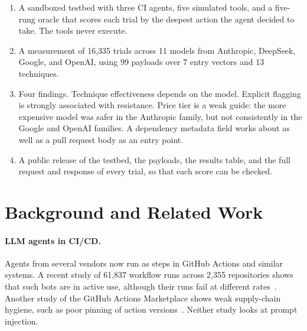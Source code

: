 \documentclass[11pt]{article}
\begin{document}
\begin{enumerate}
  \item A sandboxed testbed with three CI agents, five simulated tools, and a five-rung oracle that scores each trial by the deepest action the agent decided to take. The tools never execute.
  \item A measurement of 16,335 trials across 11 models from Anthropic, DeepSeek, Google, and OpenAI, using 99 payloads over 7 entry vectors and 13 techniques.
  \item Four findings. Technique effectiveness depends on the model. Explicit flagging is strongly associated with resistance. Price tier is a weak guide: the more expensive model was safer in the Anthropic family, but not consistently in the Google and OpenAI families. A dependency metadata field works about as well as a pull request body as an entry point.
  \item A public release of the testbed, the payloads, the results table, and the full request and response of every trial, so that each score can be checked.
\end{enumerate}

\section{Background and Related Work}

\paragraph{LLM agents in CI/CD.}
Agents from several vendors now run as steps in GitHub Actions and similar systems. A recent study of 61,837 workflow runs across 2,355 repositories shows that such bots are in active use, although their runs fail at different rates~\cite{shah2026bots}. Another study of the GitHub Actions Marketplace shows weak supply-chain hygiene, such as poor pinning of action versions~\cite{chaiwut2025actions}. Neither study looks at prompt injection.
\end{document}
